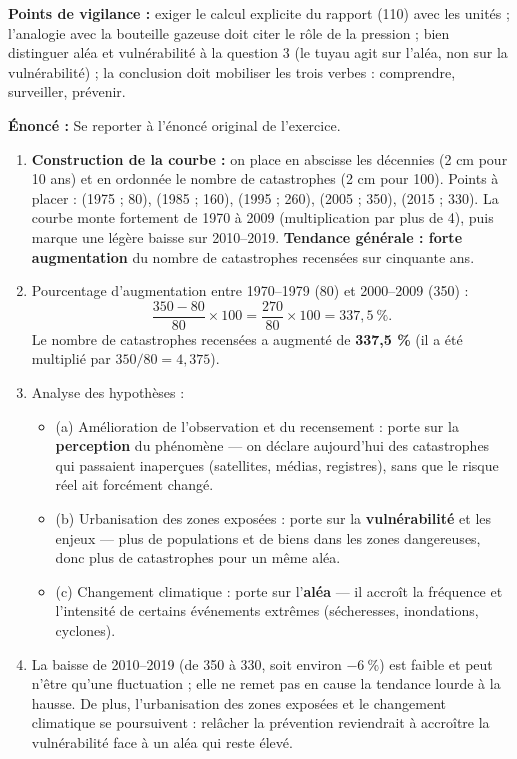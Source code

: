 \documentclass[11pt]{article}
\begin{document}
\begin{corrige}
\textbf{Points de vigilance :} exiger le calcul explicite du rapport (110) avec les unités ; l'analogie avec la bouteille gazeuse doit citer le rôle de la pression ; bien distinguer aléa et vulnérabilité à la question 3 (le tuyau agit sur l'aléa, non sur la vulnérabilité) ; la conclusion doit mobiliser les trois verbes : comprendre, surveiller, prévenir.
\end{corrige}

\begin{corrige}
\textbf{Énoncé :} Se reporter à l'énoncé original de l'exercice.
\tcblower
\begin{enumerate}
\item \textbf{Construction de la courbe :} on place en abscisse les décennies (2 cm pour 10 ans) et en ordonnée le nombre de catastrophes (2 cm pour 100). Points à placer : (1975 ; 80), (1985 ; 160), (1995 ; 260), (2005 ; 350), (2015 ; 330). La courbe monte fortement de 1970 à 2009 (multiplication par plus de 4), puis marque une légère baisse sur 2010--2019. \textbf{Tendance générale : forte augmentation} du nombre de catastrophes recensées sur cinquante ans.
\item Pourcentage d'augmentation entre 1970--1979 (80) et 2000--2009 (350) :
\[ \frac{350 - 80}{80} \times 100 = \frac{270}{80} \times 100 = 337{,}5~\%. \]
Le nombre de catastrophes recensées a augmenté de \textbf{337,5 \%} (il a été multiplié par $350/80 = 4{,}375$).
\item Analyse des hypothèses :
\begin{itemize}
\item (a) Amélioration de l'observation et du recensement : porte sur la \textbf{perception} du phénomène — on déclare aujourd'hui des catastrophes qui passaient inaperçues (satellites, médias, registres), sans que le risque réel ait forcément changé.
\item (b) Urbanisation des zones exposées : porte sur la \textbf{vulnérabilité} et les enjeux — plus de populations et de biens dans les zones dangereuses, donc plus de catastrophes pour un même aléa.
\item (c) Changement climatique : porte sur l'\textbf{aléa} — il accroît la fréquence et l'intensité de certains événements extrêmes (sécheresses, inondations, cyclones).
\end{itemize}
\item La baisse de 2010--2019 (de 350 à 330, soit environ $-6~\%$) est faible et peut n'être qu'une fluctuation ; elle ne remet pas en cause la tendance lourde à la hausse. De plus, l'urbanisation des zones exposées et le changement climatique se poursuivent : relâcher la prévention reviendrait à accroître la vulnérabilité face à un aléa qui reste élevé.

\end{enumerate}
\end{corrige}
\end{document}
